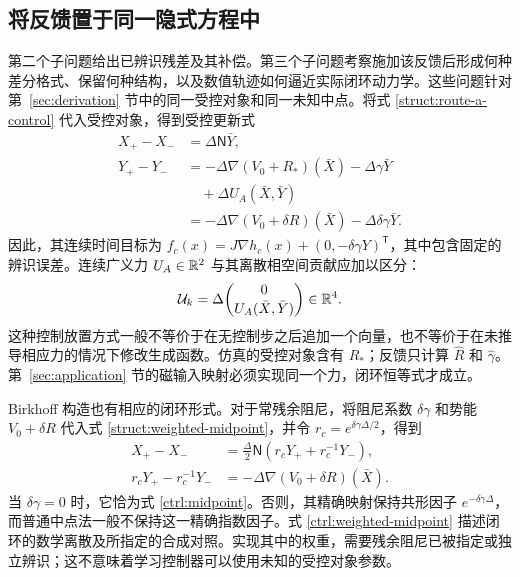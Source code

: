 \subsection{将反馈置于同一隐式方程中}
\label{ctrl:placement}

第二个子问题给出已辨识残差及其补偿。第三个子问题考察施加该反馈后形成何种差分格式、保留何种结构，以及数值轨迹如何逼近实际闭环动力学。这些问题针对第~\ref{sec:derivation} 节中的同一受控对象和同一未知中点。将式 \eqref{struct:route-a-control} 代入受控对象，得到受控更新式
\begin{equation}\label{ctrl:midpoint}
\begin{aligned}
 X_+-X_-&=\Delta\mathsf N\bar Y,\\
 Y_+-Y_-&=-\Delta\nabla(V_0+R_*)(\bar X)
               -\Delta\gamma\bar Y\\
        &\quad+\Delta U_A(\bar X,\bar Y)\\
        &=-\Delta\nabla(V_0+\delta R)(\bar X)
               -\Delta\delta\gamma\bar Y.
\end{aligned}
\end{equation}
因此，其连续时间目标为
$f_c(x)=J\nabla h_c(x)+(0,-\delta\gamma Y)^{\mathsf T}$，其中包含固定的辨识误差。连续广义力 $U_A\in\mathbb R^2$ 与其离散相空间贡献应加以区分：
\begin{equation}\label{ctrl:control-increment}
 \mathcal U_k=\Delta\binom{0}{U_A(\bar X,\bar Y)}\in\mathbb R^4.
\end{equation}
这种控制放置方式一般不等价于在无控制步之后追加一个向量，也不等价于在未推导相应力的情况下修改生成函数。仿真的受控对象含有 $R_*$；反馈只计算 $\widehat R$ 和 $\widehat\gamma$。第~\ref{sec:application} 节的磁输入映射必须实现同一个力，闭环恒等式才成立。

Birkhoff 构造也有相应的闭环形式。对于常残余阻尼，将阻尼系数 $\delta\gamma$ 和势能 $V_0+\delta R$ 代入式 \eqref{struct:weighted-midpoint}，并令 $r_c=e^{\delta\gamma\Delta/2}$，得到
\begin{equation}\label{ctrl:weighted-midpoint}
\begin{aligned}
 X_+-X_-&=\tfrac{\Delta}{2}\mathsf N
                  (r_cY_++r_c^{-1}Y_-),\\
 r_cY_+-r_c^{-1}Y_-&=-\Delta\nabla(V_0+\delta R)(\bar X).
\end{aligned}
\end{equation}
当 $\delta\gamma=0$ 时，它恰为式 \eqref{ctrl:midpoint}。否则，其精确映射保持共形因子 $e^{-\delta\gamma\Delta}$，而普通中点法一般不保持这一精确指数因子。式 \eqref{ctrl:weighted-midpoint} 描述闭环的数学离散及所指定的合成对照。实现其中的权重，需要残余阻尼已被指定或独立辨识；这不意味着学习控制器可以使用未知的受控对象参数。

